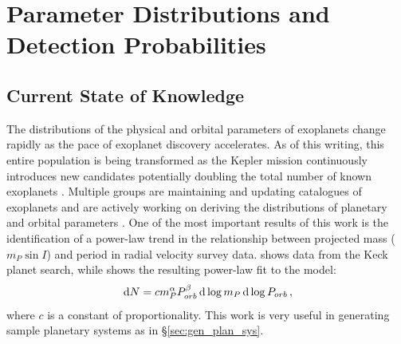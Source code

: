 \chapter{Parameter Distributions and Detection Probabilities}\label{ch:param_dists}

\section{Current State of Knowledge}\label{sec:curr_param_dists}
The distributions of the physical and orbital parameters of exoplanets change rapidly as the pace of exoplanet discovery accelerates.  As of this writing, this entire population is being transformed as the Kepler mission continuously introduces new candidates potentially doubling the total number of known exoplanets \citep{borucki2010kepler}.  Multiple groups are maintaining and updating catalogues of exoplanets and are actively working on deriving the distributions of planetary and orbital parameters \citep{marcy2005observed,cumming2008,mordasini2009extrasolarI,mordasini2009extrasolarII}.  One of the most important results of this work is the identification of a power-law trend in the relationship between projected mass ($m_P \sin I$) and period in radial velocity survey data.   shows data from the Keck planet search, while  shows the resulting power-law fit to the model:
\begin{equation}\label{eq:powerlawModel}
\,\mathrm{d}N  =  c m_P^\alpha P_{orb}^\beta \,\mathrm{d}\log m_P  \,\mathrm{d}\log P_{orb} \,,
\end{equation}
where $c$ is a constant of proportionality.  This work is very useful in generating sample planetary systems as in \S\ref{sec:gen_plan_sys}.


